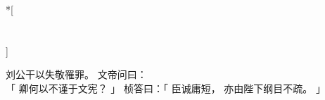 
\switchcolumn[0]*[\section{}]

刘公干以失敬罹罪。
文帝问曰：\\「
    卿何以不谨于文宪？
」
桢答曰：「
    臣诚庸短，
    亦由陛下纲目不疏。
」

\switchcolumn



